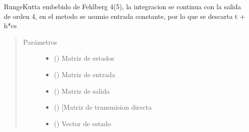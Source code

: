 \documentclass[letterpaper,10pt,spanish]{sphinxmanual}
\begin{document}
\begin{fulllineitems}
\label{\detokenize{codigos/rk_generator:rk_generator.fehlberg45}}
Runge\sphinxhyphen{}Kutta embebido de Fehlberg 4(5), la integracion se continua con la salida de orden 4, en el metodo se asumio entrada constante, por lo que se descarta t + h*cs
\begin{quote}\begin{description}
\item[{Parámetros}] \leavevmode\begin{itemize}
\item {} 
 (\sphinxstyleliteralemphasis{\sphinxupquote{, }}\sphinxstyleliteralemphasis{\sphinxupquote{, }}) \textendash{} Matriz de estados

\item {} 
 (\sphinxstyleliteralemphasis{\sphinxupquote{, }}\sphinxstyleliteralemphasis{\sphinxupquote{, }}) \textendash{} Matriz de entrada

\item {} 
 (\sphinxstyleliteralemphasis{\sphinxupquote{, }}\sphinxstyleliteralemphasis{\sphinxupquote{, }}) \textendash{} Matriz de salida

\item {} 
 (\sphinxstyleliteralemphasis{\sphinxupquote{, }}\sphinxstyleliteralemphasis{\sphinxupquote{, }}) \textendash{} {[}Matriz de transmision directa

\item {} 
 (\sphinxstyleliteralemphasis{\sphinxupquote{, }}\sphinxstyleliteralemphasis{\sphinxupquote{, }}) \textendash{} Vector de estado


\end{itemize}
\end{description}
\end{quote}
\end{fulllineitems}
\end{document}
